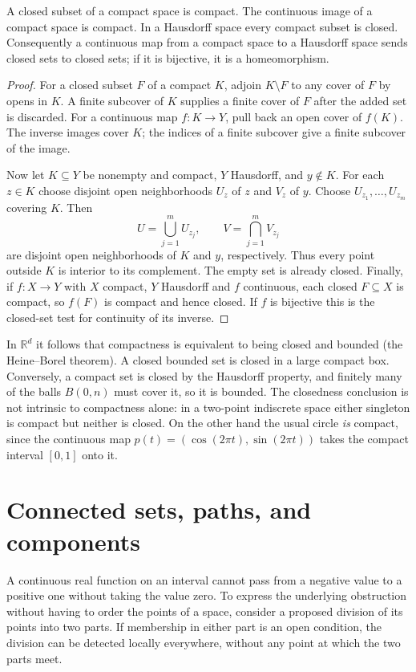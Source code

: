 \begin{theorem}\label{f:q-compact-hausdorff}
A closed subset of a compact space is compact. The continuous image of a compact space is compact. In a Hausdorff space every compact subset is closed. Consequently a continuous map from a compact space to a Hausdorff space sends closed sets to closed sets; if it is bijective, it is a homeomorphism.
\end{theorem}
\begin{proof}
For a closed subset $F$ of a compact $K$, adjoin $K\setminus F$ to any cover of $F$ by opens in $K$. A finite subcover of $K$ supplies a finite cover of $F$ after the added set is discarded. For a continuous map $f:K\to Y$, pull back an open cover of $f(K)$. The inverse images cover $K$; the indices of a finite subcover give a finite subcover of the image.

Now let $K\subseteq Y$ be nonempty and compact, $Y$ Hausdorff, and $y\notin K$. For each $z\in K$ choose disjoint open neighborhoods $U_z$ of $z$ and $V_z$ of $y$. Choose $U_{z_1},\ldots,U_{z_m}$ covering $K$. Then
\[
 U=\bigcup_{j=1}^m U_{z_j},\qquad V=\bigcap_{j=1}^m V_{z_j}
\]
are disjoint open neighborhoods of $K$ and $y$, respectively. Thus every point outside $K$ is interior to its complement. The empty set is already closed. Finally, if $f:X\to Y$ with $X$ compact, $Y$ Hausdorff and $f$ continuous, each closed $F\subseteq X$ is compact, so $f(F)$ is compact and hence closed. If $f$ is bijective this is the closed-set test for continuity of its inverse.
\end{proof}

In $\mathbb R^d$ it follows that compactness is equivalent to being closed and bounded (the Heine--Borel theorem). A closed bounded set is closed in a large compact box. Conversely, a compact set is closed by the Hausdorff property, and finitely many of the balls $B(0,n)$ must cover it, so it is bounded. The closedness conclusion is not intrinsic to compactness alone: in a two-point indiscrete space either singleton is compact but neither is closed. On the other hand the usual circle \emph{is} compact, since the continuous map $p(t)=(\cos(2\pi t),\sin(2\pi t))$ takes the compact interval $[0,1]$ onto it.

\section{Connected sets, paths, and components}

A continuous real function on an interval cannot pass from a negative value to a positive one without taking the value zero. To express the underlying obstruction without having to order the points of a space, consider a proposed division of its points into two parts. If membership in either part is an open condition, the division can be detected locally everywhere, without any point at which the two parts meet.

